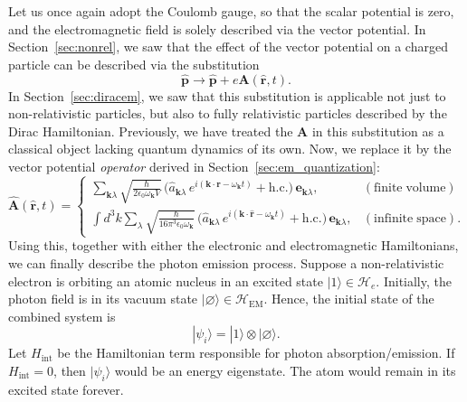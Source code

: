 \documentclass[prx,12pt]{revtex4-2}
\begin{document}
Let us once again adopt the Coulomb gauge, so that the scalar
potential is zero, and the electromagnetic field is solely described
via the vector potential.  In Section~\ref{sec:nonrel}, we saw that
the effect of the vector potential on a charged particle can be
described via the substitution
\begin{equation}
  \hat{\mathbf{p}} \rightarrow \hat{\mathbf{p}} +
  e\mathbf{A}(\hat{\mathbf{r}},t).
\end{equation}
In Section~\ref{sec:diracem}, we saw that this substitution is
applicable not just to non-relativistic particles, but also to fully
relativistic particles described by the Dirac Hamiltonian.
Previously, we have treated the $\mathbf{A}$ in this substitution as a
classical object lacking quantum dynamics of its own.  Now, we replace
it by the vector potential \textit{operator} derived in
Section~\ref{sec:em_quantization}:
\begin{equation}
  \hat{\mathbf{A}}(\hat{\mathbf{r}},t) =
  \begin{cases}
    \displaystyle
    \sum_{\mathbf{k}\lambda} 
  \sqrt{\frac{\hbar}{2\epsilon_0\omega_{\mathbf{k}}V}}\,
  \Big(\hat{a}_{\mathbf{k}\lambda} \, e^{i(\mathbf{k}\cdot\mathbf{r} - \omega_{\mathbf{k}} t)}
  + \mathrm{h.c.}\Big)\, \mathbf{e}_{\mathbf{k}\lambda}, & (\mathrm{finite}\;\mathrm{volume}) \\
  \displaystyle \int d^3k \sum_{\lambda} 
  \sqrt{\frac{\hbar}{16\pi^3\epsilon_0\omega_{\mathbf{k}}}}\,
  \Big(\hat{a}_{\mathbf{k}\lambda} \, e^{i(\mathbf{k}\cdot\hat{\mathbf{r}} - \omega_{\mathbf{k}} t)}
  + \mathrm{h.c.}\Big)\, \mathbf{e}_{\mathbf{k}\lambda},
  & (\mathrm{infinite}\;\mathrm{space}).
  \end{cases}
  \label{Aoperator}
\end{equation}
Using this, together with either the electronic and electromagnetic
Hamiltonians, we can finally describe the photon emission process.
Suppose a non-relativistic electron is orbiting an atomic nucleus in
an excited state $|1\rangle \in \mathscr{H}_e$.  Initially, the photon
field is in its vacuum state $|\varnothing\rangle \in
\mathscr{H}_{\mathrm{EM}}$.  Hence, the initial state of the combined
system is
\begin{equation}
  |\psi_i\rangle = |1\rangle \otimes |\varnothing\rangle.
\end{equation}
Let $H_{\mathrm{int}}$ be the Hamiltonian term responsible for photon
absorption/emission.  If $H_{\mathrm{int}} = 0$, then $|\psi_i\rangle$
would be an energy eigenstate.  The atom would remain in its excited
state forever.
\end{document}
